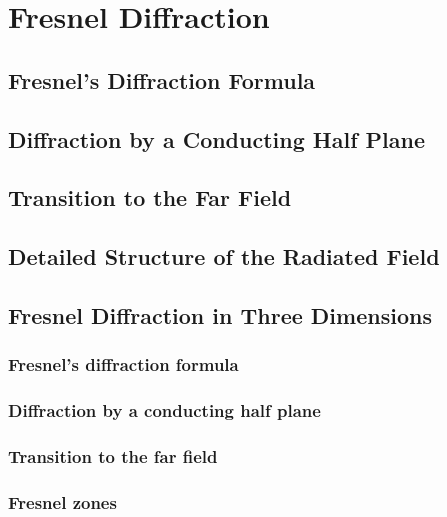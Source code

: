 \chapter{Fresnel Diffraction}
\label{ch:fesnel}

\section{Fresnel's Diffraction Formula}

\section{Diffraction by a Conducting Half Plane}

\section{Transition to the Far Field}

\section{Detailed Structure of the Radiated Field}

\section{Fresnel Diffraction in Three Dimensions}
\subsection{Fresnel's diffraction formula}

\subsection{Diffraction by a conducting half plane}

\subsection{Transition to the far field}
\label{ssec:tran2ff}

\subsection{Fresnel zones}
